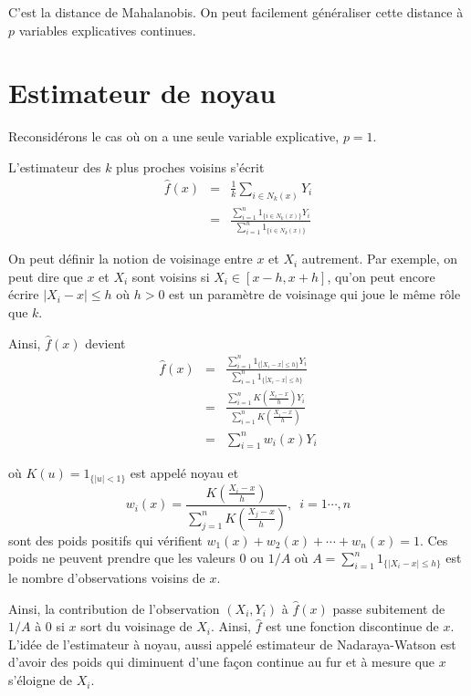 \documentclass[11pt]{article}
\begin{document}
\noindent C'est la distance de Mahalanobis. On peut facilement g\'en\'eraliser cette distance \`a $p$ variables explicatives continues.

\section{Estimateur de noyau}

\noindent Reconsid\'erons le cas o\`u on a une seule variable explicative, $p=1$.

\noindent L'estimateur des $k$ plus proches voisins s'\'ecrit 
\begin{eqnarray*}
\hat f(x) &=& \frac{1}{k} \sum_{i \in N_k(x)} Y_i \\
&=& \frac{\sum_{i=1}^n 1_{\{i \in N_k(x)\}}Y_i}{\sum_{i=1}^n 1_{\{i \in N_k(x)\}}}
\end{eqnarray*}

\noindent On peut d\'efinir la notion de voisinage entre $x$ et $X_i$ autrement. Par exemple, on peut dire que $x$ et $X_i$ sont voisins si $X_i \in [x-h,x+h]$, qu'on peut encore \'ecrire $|X_i-x| \le h$ o\`u $h>0$ est un param\`etre de voisinage qui joue le m\^eme r\^ole que $k$.

\noindent Ainsi, $\hat f(x)$ devient
\begin{eqnarray*}
\hat f(x) &=& \frac{\sum_{i=1}^n 1_{\{|X_i-x| \le h\}}Y_i}{\sum_{i=1}^n 1_{\{|X_i-x| \le h\}}} \\
&=& \frac{\sum_{i=1}^n K\left(\frac{X_i-x}{h}\right)Y_i}{\sum_{i=1}^n K\left(\frac{X_i-x}{h}\right)} \\
&=& \sum_{i=1}^n w_i(x) Y_i
\end{eqnarray*}

\noindent o\`u $K(u)=1_{\{|u|<1\}}$ est appel\'e noyau et $$w_i(x)=\frac{K\left(\frac{X_i-x}{h}\right)}{\sum_{j=1}^n K\left(\frac{X_j-x}{h}\right)}, \, \, \, i=1\cdots,n$$
sont des poids positifs qui v\'erifient $w_1(x)+w_2(x)+\cdots+w_n(x)=1$. Ces poids ne peuvent prendre que les valeurs 0 ou $1/A$ o\`u $A=\sum_{i=1}^n 1_{\{|X_i-x| \le h\}}$ est le nombre d'observations voisins de $x$. 

\noindent Ainsi, la contribution de l'observation $(X_i,Y_i)$ \`a $\hat f(x)$ passe subitement de $1/A$ \`a 0 si $x$ sort du voisinage de $X_i$. Ainsi, $\hat f$ est une fonction discontinue de $x$. L'id\'ee de l'estimateur \`a noyau, aussi appel\'e estimateur de Nadaraya-Watson est d'avoir des poids qui diminuent d'une fa\c{c}on continue au fur et \`a mesure que $x$ s'\'eloigne de $X_i$.
\end{document}
